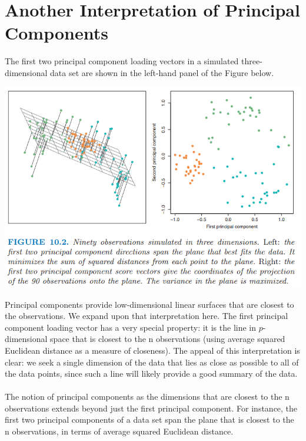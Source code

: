 \section{Another Interpretation of Principal Components}
The first two principal component loading vectors in a simulated three-dimensional data set are shown in the left-hand panel of the Figure below.
\begin{center}
    \includegraphics[scale=0.8]{images/3d pca.png}
\end{center}
Principal components provide low-dimensional linear surfaces that are closest to the observations. We expand upon that interpretation here. The first principal component loading vector has a very special property: it is the line in $p$-dimensional space that is closest to the n observations (using average squared Euclidean distance as a measure of closeness). The appeal of this interpretation is clear: we seek a single dimension of the data that lies as close as possible to all of the data points, since such a line will likely provide a good summary of the data.\\\\
The notion of principal components as the dimensions that are closest to the n observations extends beyond just the first principal component.  For instance, the first two principal components of a data set span the plane that is closest to the n observations, in terms of average squared Euclidean distance.

